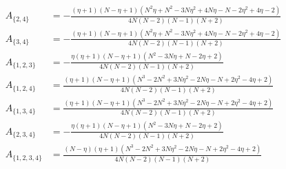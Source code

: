 \documentclass[11pt]{article}
\begin{document}
\begin{align*}
  A_{\{2,4\}} &= - \frac{\left(\eta + 1\right) \left(N - \eta + 1\right) \left(N^{2} \eta + N^{2} - 3 N \eta^{2} + 4 N \eta - N - 2 \eta^{2} + 4 \eta - 2\right)}{4 N \left(N - 2\right) \left(N - 1\right) \left(N + 2\right)} \\
  A_{\{3,4\}} &= - \frac{\left(\eta + 1\right) \left(N - \eta + 1\right) \left(N^{2} \eta + N^{2} - 3 N \eta^{2} + 4 N \eta - N - 2 \eta^{2} + 4 \eta - 2\right)}{4 N \left(N - 2\right) \left(N - 1\right) \left(N + 2\right)} \\
  A_{\{1,2,3\}} &= - \frac{\eta \left(\eta + 1\right) \left(N - \eta + 1\right) \left(N^{2} - 3 N \eta + N - 2 \eta + 2\right)}{4 N \left(N - 2\right) \left(N - 1\right) \left(N + 2\right)} \\
  A_{\{1,2,4\}} &= \frac{\left(\eta + 1\right) \left(N - \eta + 1\right) \left(N^{3} - 2 N^{2} + 3 N \eta^{2} - 2 N \eta - N + 2 \eta^{2} - 4 \eta + 2\right)}{4 N \left(N - 2\right) \left(N - 1\right) \left(N + 2\right)} \\
  A_{\{1,3,4\}} &= \frac{\left(\eta + 1\right) \left(N - \eta + 1\right) \left(N^{3} - 2 N^{2} + 3 N \eta^{2} - 2 N \eta - N + 2 \eta^{2} - 4 \eta + 2\right)}{4 N \left(N - 2\right) \left(N - 1\right) \left(N + 2\right)} \\
  A_{\{2,3,4\}} &= - \frac{\eta \left(\eta + 1\right) \left(N - \eta + 1\right) \left(N^{2} - 3 N \eta + N - 2 \eta + 2\right)}{4 N \left(N - 2\right) \left(N - 1\right) \left(N + 2\right)} \\
  A_{\{1,2,3,4\}} &= \frac{\left(N - \eta\right) \left(\eta + 1\right) \left(N^{3} - 2 N^{2} + 3 N \eta^{2} - 2 N \eta - N + 2 \eta^{2} - 4 \eta + 2\right)}{4 N \left(N - 2\right) \left(N - 1\right) \left(N + 2\right)} 
\end{align*}
\end{document}
